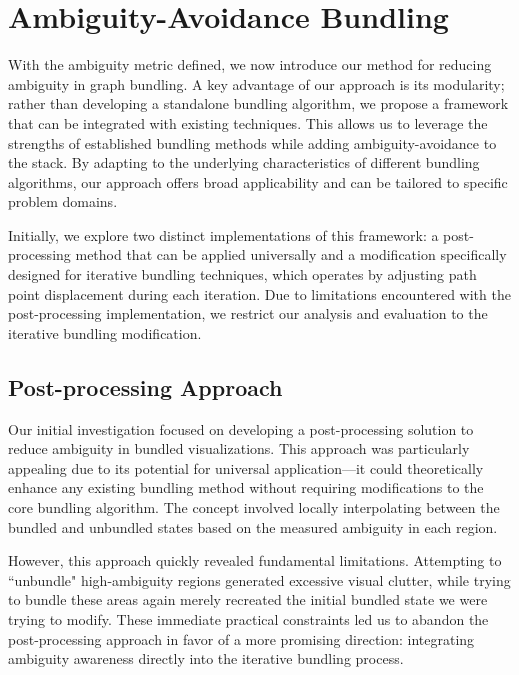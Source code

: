
\section{Ambiguity-Avoidance Bundling}\label{sec:bundling}

With the ambiguity metric defined, we now introduce our method for reducing ambiguity in graph bundling. A key advantage of our approach is its modularity; rather than developing a standalone bundling algorithm, we propose a framework that can be integrated with existing techniques. This allows us to leverage the strengths of established bundling methods while adding ambiguity-avoidance to the stack. By adapting to the underlying characteristics of different bundling algorithms, our approach offers broad applicability and can be tailored to specific problem domains.

Initially, we explore two distinct implementations of this framework: a post-processing method that can be applied universally and a modification specifically designed for iterative bundling techniques, which operates by adjusting path point displacement during each iteration. Due to limitations encountered with the post-processing implementation, we restrict our analysis and evaluation to the iterative bundling modification.


\subsection{Post-processing Approach}

Our initial investigation focused on developing a post-processing solution to reduce ambiguity in bundled visualizations. This approach was particularly appealing due to its potential for universal application—it could theoretically enhance any existing bundling method without requiring modifications to the core bundling algorithm. The concept involved locally interpolating between the bundled and unbundled states based on the measured ambiguity in each region.

However, this approach quickly revealed fundamental limitations. Attempting to ``unbundle" high-ambiguity regions generated excessive visual clutter, while trying to bundle these areas again merely recreated the initial bundled state we were trying to modify. These immediate practical constraints led us to abandon the post-processing approach in favor of a more promising direction: integrating ambiguity awareness directly into the iterative bundling process.


